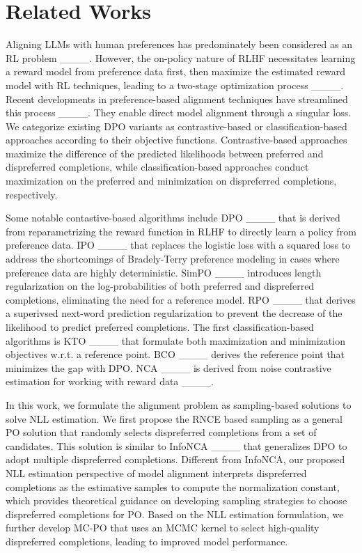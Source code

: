 \section{Related Works}
\label{sec: related works}
Aligning LLMs with human preferences has predominately been considered as an RL problem ____.
However,
the on-policy nature of RLHF necessitates learning a reward model from preference data first,
then maximize the estimated reward model with RL techniques,
leading to a two-stage optimization process ____.
Recent developments in preference-based alignment techniques have streamlined this process ____.
They enable direct model alignment through a singular loss.
We categorize existing DPO variants as contrastive-based or classification-based approaches according to their objective functions.
Contrastive-based approaches maximize the difference of the predicted likelihoods between preferred and dispreferred completions,
while classification-based approaches conduct maximization on the preferred and minimization on dispreferred completions, respectively.

Some notable contastive-based algorithms include 
DPO ____
that is derived from reparametrizing the reward function in RLHF to directly learn a policy from preference data.
IPO ____ that replaces the logistic loss with a squared loss to address the shortcomings of Bradely-Terry preference modeling in cases where preference data are highly deterministic.
SimPO ____ introduces length regularization on the log-probabilities of both preferred and dispreferred completions, eliminating the need for a reference model. 
RPO ____ that derives a superivsed next-word prediction regularization to prevent the decrease of the likelihood to predict preferred completions.
The first classification-based algorithms is
KTO ____ that formulate both maximization and minimization objectives w.r.t. a reference point.
BCO ____
derives the reference point that minimizes the gap with DPO.
NCA ____ is derived from noise contrastive estimation for working with reward data ____.

In this work, we formulate the alignment problem as sampling-based solutions to solve NLL estimation. 
We first propose the RNCE based sampling as a general PO solution that randomly selects dispreferred completions from a set of candidates.
This solution is similar to InfoNCA ____ that generalizes DPO to adopt multiple dispreferred completions. 
Different from InfoNCA, our proposed NLL estimation perspective of model alignment interprets dispreferred completions as the estimative samples to compute the normalization constant, which provides theoretical guidance on developing sampling strategies to choose dispreferred completions for PO.
Based on the NLL estimation formulation, we further develop MC-PO that uses an MCMC kernel to select high-quality dispreferred completions, leading to improved model performance.